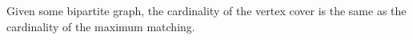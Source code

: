Given some bipartite graph, the cardinality of 
the vertex cover is the same as the cardinality 
of the maximum matching.